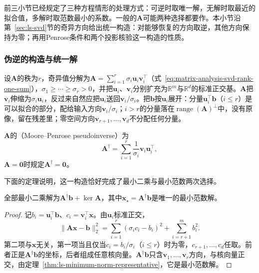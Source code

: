 前三小节已经规定了三种方程情形的处理方式：可逆时取唯一解，无解时取最近的拟合值，多解时取范数最小的系数。一般的$\bm A$可能两种选择都要作。本小节沿第~\ref{sec:ls-svd}节的奇异方向给出统一构造：对能够恢复的方向取逆，其他方向保持为零；再用Penrose条件和两个投影核验这一构造的性质。

\subsubsection{伪逆的构造与统一解}
\label{sec:ls-pseudoinverse-construction}

设$\bm A$的秩为$r$，奇异值分解为$\bm A=\sum_{i=1}^r\sigma_i\bm u_i\bm v_i^\top$（式~\eqref{eq:matrix-analysis-svd-rank-one-sum}），$\sigma_1\geq\cdots\geq\sigma_r>0$，并把$\bm u_i$、$\bm v_i$分别扩充为$\mathbb R^m$与$\mathbb R^d$的标准正交基。$\bm A$把$\bm v_i$伸缩为$\sigma_i\bm u_i$，反过来自然应把$\bm u_i$送回$\bm v_i/\sigma_i$。把$\bm b$按$\bm u_i$展开：分量$\bm u_i^\top\bm b$（$i\leq r$）是可以拟合的部分，配给输入方向$\bm v_i/\sigma_i$；$i>r$的分量落在$\operatorname{range}(\bm A)^\perp$中，没有原像，留在残差里；零空间方向$\bm v_{r+1},\ldots,\bm v_d$不分配任何分量。

\begin{definition}
\label{def:matrix-analysis-pseudoinverse}
$\bm A$的（Moore--Penrose pseudoinverse）为
\begin{equation}
 \bm A^\dagger=\sum_{i=1}^r\frac{1}{\sigma_i}\bm v_i\bm u_i^\top ,
 \label{eq:matrix-analysis-pseudoinverse}
\end{equation}
$\bm A=\bm0$时规定$\bm A^\dagger=\bm0$。
\end{definition}

下面的定理说明，这一构造恰好完成了最小二乘与最小范数两次选择。

\begin{theorem}[伪逆给出最小范数最小二乘解]
\label{thm:matrix-analysis-pseudoinverse-minimum-norm}
全部最小二乘解为$\bm A^\dagger\bm b+\ker\bm A$，其中$\bm x_\star=\bm A^\dagger\bm b$是唯一的最小范数解。
\end{theorem}
\begin{proof}
记$b_i=\bm u_i^\top\bm b$、$c_i=\bm v_i^\top\bm x$。由$\bm u_i$标准正交，
\[
 \lVert\bm A\bm x-\bm b\rVert_2^2
 =\sum_{i=1}^r(\sigma_ic_i-b_i)^2+\sum_{i=r+1}^m b_i^2 .
\]
第二项与$\bm x$无关，第一项当且仅当$c_i=b_i/\sigma_i$（$i\leq r$）时为零，$c_{r+1},\ldots,c_d$任取。前者正是$\bm A^\dagger\bm b$的坐标，后者组成任意核向量。$\bm A^\dagger\bm b$只含$\bm v_1,\ldots,\bm v_r$方向，与核向量正交，由定理~\ref{thm:ls-minimum-norm-representative}，它是最小范数解。
\end{proof}

